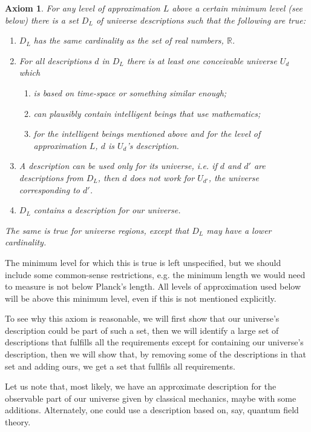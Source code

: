 \documentclass[a4paper
,draft
]{article}
\def\reale{\mathbb{R}}
\def\descriptions{D_L}
\newtheorem{axiom}{Axiom}
\begin{document}
\begin{axiom}\label{ax:uncountable}
  For any level of approximation $L$ above a certain minimum level (see below)
  there is a set $\descriptions$
  of universe descriptions such that the following are true:
  \begin{enumerate}
    \item $\descriptions$ has the same cardinality as
          the set of real numbers, $\reale$.
    \item For all descriptions $d$ in $\descriptions$
          there is at least one conceivable
          universe $U_d$ which
      \begin{enumerate}
        \item is based on time-space or something similar enough;
        \item can plausibly contain intelligent beings that use mathematics;
        \item for the intelligent beings mentioned above and
              for the level of approximation $L$,
              $d$ is $U_d$'s description.
      \end{enumerate}
    \item A description can be used only for its universe, i.e.
          if $d$ and $d'$ are descriptions from $\descriptions$,
          then $d$ does not work
          for $U_{d'}$, the universe corresponding to $d'$.
    \item $\descriptions$ contains a description for our universe.
  \end{enumerate}
  The same is true for universe regions, except that
  $\descriptions$ may have a lower
  cardinality.
\end{axiom}

The minimum level for which this is true is left unspecified, but we should
include some common-sense restrictions, e.g. the minimum length we would
need to measure is not below Planck's length.
All levels of approximation used below will be above this
minimum level, even if this is not mentioned explicitly.

To see why this axiom is reasonable, we will first show that our universe's
description could be part of such a set, then we will identify a large set
of descriptions that fulfills all the requirements except for containing
our universe's description, then we will show that, by removing some of the
descriptions in that set and adding ours, we get a set that fullfils all
requirements.

Let us note that,
most likely, we have an approximate description for the observable part
of our universe
given by classical mechanics, maybe with some additions.
Alternately, one could use a description based on, say, quantum field theory.
\end{document}
